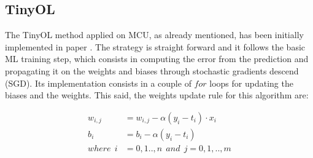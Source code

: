 \documentclass[12pt]{report}
\begin{document}
\subsection{TinyOL}
The TinyOL method applied on MCU, as already mentioned, has been initially implemented in paper \autocite{ren2021tinyol}. The strategy is straight forward and it follows the basic ML training step, which consists in computing the error from the prediction and propagating it on the weights and biases through stochastic gradients descend (SGD). Its implementation consists in a couple of $for$ loops for updating the biases and the weights. This said, the weights update rule for this algorithm are:

\begin{align}
    w_{i,j} &= w_{i,j} - \alpha (y_i - t_i) \cdot x_i \\
    b_i     &= b_i - \alpha (y_i - t_i) \\
    where \:\: i &= 0,1..,n  \: \: and \: \:  j=0,1,..,m \nonumber 
\end{align}
\end{document}
